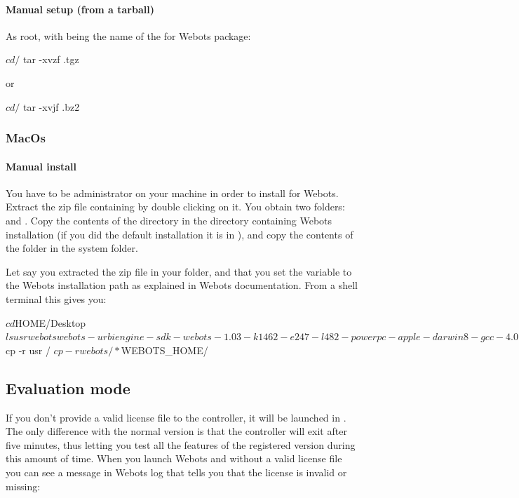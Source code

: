 \paragraph{Manual setup (from a tarball)}
\label{webots.setup.linux.tarball}%
As root, with  being the name of the \urbi for Webots
package:

\begin{shell}
$ cd /
$ tar -xvzf  .tgz
\end{shell}
or

\begin{shell}
$ cd /
$ tar -xvjf  .bz2
\end{shell}

\subsubsection{MacOs}
\label{webots.setup.macos}%

\paragraph{Manual install}
\label{webots.setup.macos.manual}%

You have to be administrator on your machine in order to install \urbi
for Webots.  Extract the zip file containing \urbi by double clicking
on it.  You obtain two folders:  and .  Copy
the contents of the  directory in the directory
containing Webots installation (if you did the default installation it
is in ), and copy the contents of the
 folder in the  system folder.

Let say you extracted the zip file in your  folder, and
that you set the variable  to the Webots
installation path as explained in Webots documentation.  From a shell
terminal this gives you:

\begin{shell}
$ cd $HOME/Desktop
$ ls
usr webots
webots-urbiengine-sdk-webots-1.03-k1462-e247-l482-powerpc-apple-darwin8-gcc-4.0.1.zip
$ cp -r usr /
$ cp -r webots/* $WEBOTS_HOME/
\end{shell}

\subsection{Evaluation mode}
\label{webots.evaluation}%

If you don't provide a valid license file to the \urbi controller, it
will be launched in . The only difference with
the normal version is that the controller will exit after five
minutes, thus letting you test all the features of the registered
version during this amount of time. When you launch Webots and \urbi
without a valid license file you can see a message in Webots log that
tells you that the license is invalid or missing:

